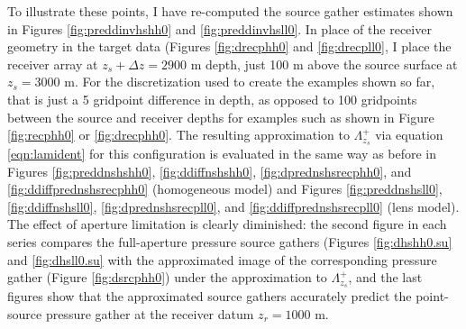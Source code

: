 To illustrate these points, I have re-computed the source gather
estimates shown in Figures \ref{fig:preddinvhshh0} and
\ref{fig:preddinvhsll0}. In place of the receiver geometry in the
target data (Figures \ref{fig:drecphh0} and \ref{fig:drecpll0}, I
place the receiver array at $z_s+\Delta z=2900$ m depth, just 100 m above the
source surface at $z_s=3000$ m. For the discretization used to create
the examples shown so far, that is just a 5 gridpoint difference in
depth, as opposed to 100 gridpoints between the source and receiver
depths for examples such as shown in Figure \ref{fig:recphh0} or
\ref{fig:drecphh0}. The resulting approximation to $\Lambda_{z_s}^+$
via equation \ref{eqn:lamident} for this configuration is evaluated in
the same way as before in Figures \ref{fig:preddnshshh0}, \ref{fig:ddiffnshshh0},
\ref{fig:dprednshsrecphh0}, and \ref{fig:ddiffprednshsrecphh0}
(homogeneous model) and Figures \ref{fig:preddnshsll0}, \ref{fig:ddiffnshsll0},
\ref{fig:dprednshsrecpll0}, and \ref{fig:ddiffprednshsrecpll0} (lens
model). The effect of aperture limitation is clearly diminished: the
second figure in each series compares the full-aperture pressure source
gathers (Figures \ref{fig:dhshh0.su} and \ref{fig:dhsll0.su} with the
approximated image of the corresponding pressure gather (Figure
\ref{fig:dsrcphh0}) under the approximation to $\Lambda_{z_s}^+$, and
the last figures show that the approximated source gathers accurately
predict the point-source pressure gather at the receiver datum
$z_r=1000$ m.

